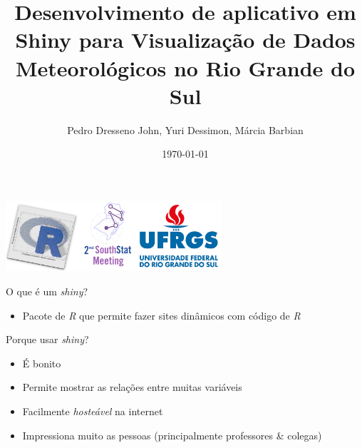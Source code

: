 \documentclass[aspectratio=1610]{beamer}
\title{Desenvolvimento de aplicativo em Shiny para Visualização de Dados Meteorológicos no Rio Grande do Sul}
\date{\today}
\author{Pedro Dresseno John, Yuri Dessimon, Márcia Barbian}
\begin{document}
\begin{frame}
    \vspace{0.5cm}
    \includegraphics[width=8cm]{3logos.png}
    \vspace{-2.5cm}
    \titlepage
\end{frame}


\begin{frame}{O que é um \textit{shiny}?}
    \begin{itemize}
        \item Pacote de \textit{R} que permite fazer sites dinâmicos com código de \textit{R}
    \end{itemize}
\end{frame}

\begin{frame}{Porque usar \textit{shiny}?}
    \begin{itemize}
        \item É bonito \smiley{} \pause
        \item Permite mostrar as relações entre muitas variáveis \pause
        \item Facilmente \textit{hosteável} na internet \pause
        \item Impressiona muito as pessoas (principalmente professores \& colegas)
    \end{itemize}
\end{frame}
\end{document}
